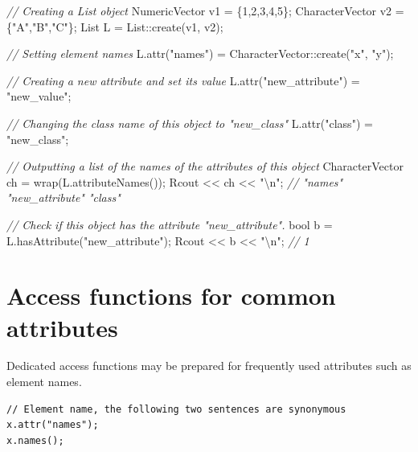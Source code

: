\documentclass[
]{book}
\newenvironment{Shaded}{\begin{snugshade}}{\end{snugshade}}
\newcommand{\CommentTok}[1]{\textcolor[rgb]{0.56,0.35,0.01}{\textit{#1}}}
\newcommand{\DataTypeTok}[1]{\textcolor[rgb]{0.13,0.29,0.53}{#1}}
\newcommand{\DecValTok}[1]{\textcolor[rgb]{0.00,0.00,0.81}{#1}}
\newcommand{\NormalTok}[1]{#1}
\newcommand{\SpecialCharTok}[1]{\textcolor[rgb]{0.00,0.00,0.00}{#1}}
\newcommand{\StringTok}[1]{\textcolor[rgb]{0.31,0.60,0.02}{#1}}
\begin{document}
\begin{Shaded}
\begin{Highlighting}[]
\CommentTok{// Creating a List object}
\NormalTok{NumericVector   v1 = \{}\DecValTok{1}\NormalTok{,}\DecValTok{2}\NormalTok{,}\DecValTok{3}\NormalTok{,}\DecValTok{4}\NormalTok{,}\DecValTok{5}\NormalTok{\};}
\NormalTok{CharacterVector v2 = \{}\StringTok{"A"}\NormalTok{,}\StringTok{"B"}\NormalTok{,}\StringTok{"C"}\NormalTok{\};}
\NormalTok{List L = List::create(v1, v2);}

\CommentTok{// Setting element names}
\NormalTok{L.attr(}\StringTok{"names"}\NormalTok{) = CharacterVector::create(}\StringTok{"x"}\NormalTok{, }\StringTok{"y"}\NormalTok{);}

\CommentTok{// Creating a new attribute and set its value}
\NormalTok{L.attr(}\StringTok{"new_attribute"}\NormalTok{) = }\StringTok{"new_value"}\NormalTok{;}

\CommentTok{// Changing the class name of this object to "new_class"}
\NormalTok{L.attr(}\StringTok{"class"}\NormalTok{) = }\StringTok{"new_class"}\NormalTok{;}

\CommentTok{// Outputting a list of the names of the attributes of this object}
\NormalTok{CharacterVector ch = wrap(L.attributeNames());}
\NormalTok{Rcout << ch << }\StringTok{"}\SpecialCharTok{\textbackslash{}n}\StringTok{"}\NormalTok{; }\CommentTok{// "names" "new_attribute" "class"}

\CommentTok{// Check if this object has the attribute "new_attribute".}
\DataTypeTok{bool}\NormalTok{ b = L.hasAttribute(}\StringTok{"new_attribute"}\NormalTok{);}
\NormalTok{Rcout << b << }\StringTok{"}\SpecialCharTok{\textbackslash{}n}\StringTok{"}\NormalTok{; }\CommentTok{// 1}
\end{Highlighting}
\end{Shaded}

\hypertarget{access-functions-for-common-attributes}{%
\section{Access functions for common attributes}\label{access-functions-for-common-attributes}}

Dedicated access functions may be prepared for frequently used attributes such as element names.

\begin{verbatim}
// Element name, the following two sentences are synonymous
x.attr("names");
x.names();
\end{verbatim}
\end{document}
